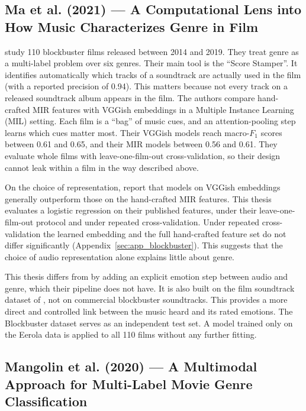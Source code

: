 \subsection{Ma et al. (2021) --- A Computational Lens into How Music Characterizes Genre in Film}

\citet{ma2021computational} study 110 blockbuster films released between 2014 and 2019. They treat genre as a multi-label problem over six genres. Their main tool is the ``Score Stamper''. It identifies automatically which tracks of a soundtrack are actually used in the film (with a reported precision of 0.94). This matters because not every track on a released soundtrack album appears in the film. The authors compare hand-crafted MIR features with VGGish embeddings in a Multiple Instance Learning (MIL) setting. Each film is a ``bag'' of music cues, and an attention-pooling step learns which cues matter most. Their VGGish models reach macro-$F_1$ scores between 0.61 and 0.65, and their MIR models between 0.56 and 0.61. They evaluate whole films with leave-one-film-out cross-validation, so their design cannot leak within a film in the way described above.

On the choice of representation, \citeauthor{ma2021computational} report that models on VGGish embeddings generally outperform those on the hand-crafted MIR features. This thesis evaluates a logistic regression on their published features, under their leave-one-film-out protocol and under repeated cross-validation. Under repeated cross-validation the learned embedding and the full hand-crafted feature set do not differ significantly (Appendix~\ref{sec:app_blockbuster}). This suggests that the choice of audio representation alone explains little about genre.

This thesis differs from \citet{ma2021computational} by adding an explicit emotion step between audio and genre, which their pipeline does not have. It is also built on the film soundtrack dataset of \citet{eerola2011comparison}, not on commercial blockbuster soundtracks. This provides a more direct and controlled link between the music heard and its rated emotions. The Blockbuster dataset serves as an independent test set. A model trained only on the Eerola data is applied to all 110 films without any further fitting.

\subsection{Mangolin et al. (2020) --- A Multimodal Approach for Multi-Label Movie Genre Classification}


